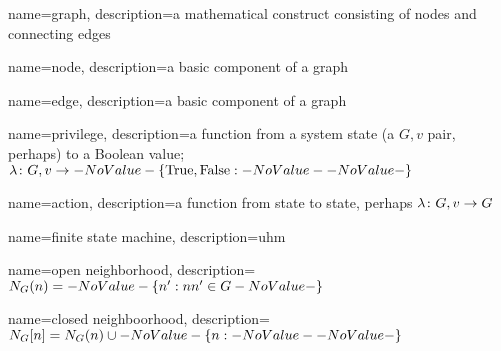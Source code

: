 
{
  name=graph,
  description={a mathematical construct consisting of nodes and connecting edges}
}

{
  name=node,
  description={a basic component of a graph}
}

{
  name=edge,
  description={a basic component of a graph}
}

{
  name=privilege,
  description={a function from a system state (a $G, v$ pair, perhaps) to a Boolean value; $\Function{G, v}{\SetBoolean}$}
}

{
  name=action,
  description={a function from state to state, perhaps $\Function{G, v}{G}$}
}

{
  name=finite state machine,
  description={uhm}
}

{
  name=open neighborhood,
  description={$\OpenNeighborhood{n}[G] = \Set{n^\prime}[nn^\prime \in G]$}
}

{
  name=closed neighboorhood,
  description={$\ClosedNeighborhood{n}[G] = \OpenNeighborhood{n}[G] \cup \Set{n}$}
}

